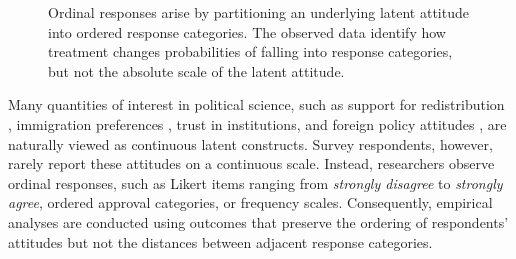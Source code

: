 \documentclass{article}
\begin{document}
\begin{figure}[ht]
\centering
{}

\caption{Ordinal responses arise by partitioning an underlying latent attitude into ordered response categories. The observed data identify how treatment changes probabilities of falling into response categories, but not the absolute scale of the latent attitude.}
\label{fig:latent}
\end{figure}

Many quantities of interest in political science, such as support for redistribution \citep{Alt2017a, Magni2021a}, immigration preferences \citep{Mayda2005a}, trust in institutions, and foreign policy attitudes \citep{Scheve2001r, Tomz2020a}, are naturally viewed as continuous latent constructs. Survey respondents, however, rarely report these attitudes on a continuous scale. Instead, researchers observe ordinal responses, such as Likert items ranging from \textit{strongly disagree} to \textit{strongly agree}, ordered approval categories, or frequency scales. Consequently, empirical analyses are conducted using outcomes that preserve the ordering of respondents’ attitudes but not the distances between adjacent response categories.
\end{document}
